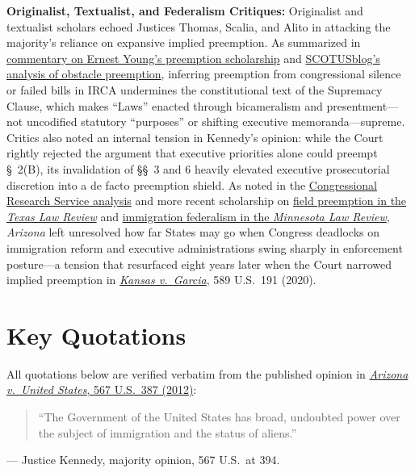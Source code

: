 \documentclass[12pt]{article}
\begin{document}
\textbf{Originalist, Textualist, and Federalism Critiques:} Originalist and textualist scholars echoed Justices Thomas, Scalia, and Alito in attacking the majority's reliance on expansive implied preemption. As summarized in \href{https://www.scotusblog.com/2012/08/academic-highlight-young-on-the-roberts-court-and-preemption/}{commentary on Ernest Young's preemption scholarship} and \href{https://www.scotusblog.com/2011/07/arizona-v-united-states-narrowing-prevent-or-frustrate-conflict-preemption/}{SCOTUSblog's analysis of obstacle preemption}, inferring preemption from congressional silence or failed bills in IRCA undermines the constitutional text of the Supremacy Clause, which makes ``Laws'' enacted through bicameralism and presentment---not uncodified statutory ``purposes'' or shifting executive memoranda---supreme. Critics also noted an internal tension in Kennedy's opinion: while the Court rightly rejected the argument that executive priorities alone could preempt \S~2(B), its invalidation of \S\S~3 and 6 heavily elevated executive prosecutorial discretion into a de facto preemption shield. As noted in the \href{https://www.everycrsreport.com/reports/R42719.html}{Congressional Research Service analysis} and more recent scholarship on \href{https://texaslawreview.org/obsolescent-preemption/}{field preemption in the \textit{Texas Law Review}} and \href{https://scholarship.law.umn.edu/cgi/viewcontent.cgi?article=1189&context=minnlrev}{immigration federalism in the \textit{Minnesota Law Review}}, \textit{Arizona} left unresolved how far States may go when Congress deadlocks on immigration reform and executive administrations swing sharply in enforcement posture---a tension that resurfaced eight years later when the Court narrowed implied preemption in \href{https://supreme.justia.com/cases/federal/us/589/17-834/}{\textit{Kansas v.\ Garcia}}, 589 U.S.\ 191 (2020).

\section{Key Quotations}

All quotations below are verified verbatim from the published opinion in \href{https://supreme.justia.com/cases/federal/us/567/387/}{\textit{Arizona v.\ United States}, 567 U.S.\ 387 (2012)}:

\begin{quote}
``The Government of the United States has broad, undoubted power over the subject of immigration and the status of aliens.''
\end{quote}
\noindent --- Justice Kennedy, majority opinion, 567 U.S.\ at 394.
\end{document}
